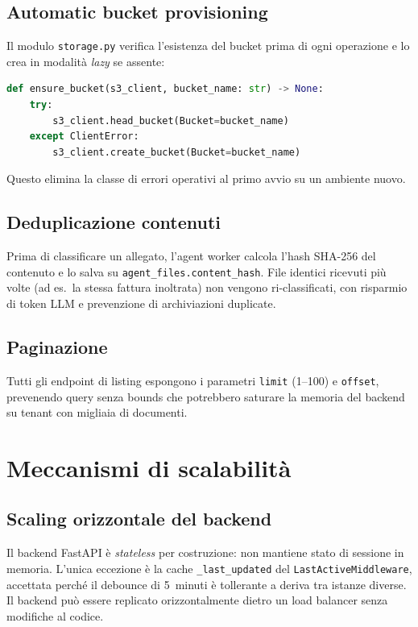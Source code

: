 \subsection{Automatic bucket provisioning}

Il modulo \texttt{storage.py} verifica l'esistenza del bucket prima di ogni operazione
e lo crea in modalit\`a \emph{lazy} se assente:

\begin{lstlisting}[language=Python]
def ensure_bucket(s3_client, bucket_name: str) -> None:
    try:
        s3_client.head_bucket(Bucket=bucket_name)
    except ClientError:
        s3_client.create_bucket(Bucket=bucket_name)
\end{lstlisting}

Questo elimina la classe di errori operativi al primo avvio su un ambiente nuovo.

\subsection{Deduplicazione contenuti}

Prima di classificare un allegato, l'agent worker calcola l'hash SHA-256 del contenuto
e lo salva su \texttt{agent\_files.content\_hash}. File identici ricevuti pi\`u volte
(ad es.\ la stessa fattura inoltrata) non vengono ri-classificati, con risparmio di
token LLM e prevenzione di archiviazioni duplicate.

\subsection{Paginazione}

Tutti gli endpoint di listing espongono i parametri \texttt{limit} (1--100) e \texttt{offset},
prevenendo query senza bounds che potrebbero saturare la memoria del backend su tenant
con migliaia di documenti.

\section{Meccanismi di scalabilit\`a}
\label{sec:scalabilita}

\subsection{Scaling orizzontale del backend}

Il backend FastAPI \`e \emph{stateless} per costruzione: non mantiene stato di sessione
in memoria. L'unica eccezione \`e la cache \texttt{\_last\_updated} del
\texttt{LastActiveMiddleware}, accettata perch\'e il debounce di 5~minuti \`e tollerante
a deriva tra istanze diverse. Il backend pu\`o essere replicato orizzontalmente dietro
un load balancer senza modifiche al codice.

